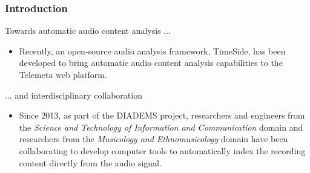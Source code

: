 \documentclass[final, hyperref, table]{beamer}
\begin{document}
\begin{frame}\frametitle{Introduction}
  

\begin{block}{Towards automatic audio content analysis ...}
  \begin{itemize}
  \item Recently, an open-source audio analysis framework,
    TimeSide, has been developed to bring automatic audio content
    analysis capabilities to the Telemeta web platform.
  \end{itemize}

\end{block}
\begin{block}{... and interdisciplinary collaboration}
  \begin{itemize}
  \item Since 2013, as part of the DIADEMS project, researchers and engineers from the \emph{Science and Technology of Information and Communication} domain and researchers from the \emph{Musicology and Ethnomusicology} domain have been collaborating to develop computer tools to automatically index the recording content directly from the audio signal.%
  \end{itemize}
  
\end{block}

\end{frame}
\end{document}
